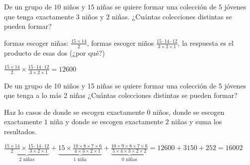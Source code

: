 \documentclass[11pt]{scrartcl}
\begin{document}
\begin{problem}
    De un grupo de $10$ niños y $15$ niñas se quiere
    formar una colección de $5$ jóvenes que tenga exactamente $3$ niños y $2$ niñas.
    ¿Cuántas colecciones distintas se pueden formar?

  \begin{hint}
  formas escoger niñas: $\frac{15\times14}{2}$, formas escoger niños $\frac{15\cdot14\cdot12}{3\times2\times1}$, la respuesta es el producto de esas dos (¿por qué?)
  \end{hint}
  \begin{answer}
      $\frac{15\times14}{2}\times\frac{15\cdot14\cdot12}{3\times2\times1}=12600$
  \end{answer}
\end{problem}
\vspace{0.1cm}
\begin{problem}
    De un grupo de 10 niños y 15 niñas se quiere formar una colección de 5 jóvenes que tenga a lo más 2 niñas ¿Cuántas colecciones distintas se pueden formar?
    \begin{hint}
        Haz lo casos de donde se escogen exactamente $0$ niños, donde se escogen exactamente $1$ niña y donde se escogen exactamente $2$ niñas y suma los resultados.
    \end{hint}
   \begin{answer}
       $\underbrace{\frac{15\times14}{2}\times\frac{15\cdot14\cdot12}{3\times2\times1}}_{\text{2 niñas}}+\underbrace{15\times \frac{10\times 8\times 7\times 6}{4\times3\times2\times 1}}_{\text{1 niña}}+\underbrace{\frac{10\times9\times 8\times 7\times 6}{5\times 4\times 3\times 2\times 2}}_{\text{0 niñas}}=12600+3150+252=16002$
   \end{answer}
\end{problem}
\vspace*{0.1cm}
\end{document}
